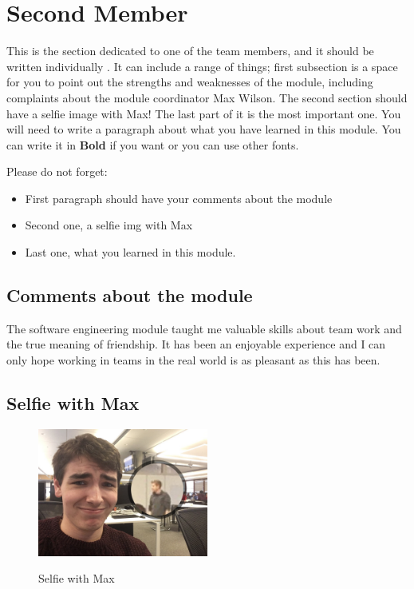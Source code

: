 \section{Second Member}
This is the section dedicated to one of the team members, and it should be written individually . It can include a range of things; first subsection is a space for you to point out the strengths and weaknesses of the module, including complaints about the module coordinator Max Wilson. The second section should have a selfie image with Max! The last part of it is the most important one. You will need to write a paragraph about what you have learned in this module. You can write it in \textbf{Bold} if you want or you can use other fonts. 

Please do not forget:
\begin{itemize}
	\item First paragraph should have your comments about the module
	\item Second one, a selfie img with Max
	\item Last one, what you learned in this module.
\end{itemize}

\subsection{Comments about the module}
The software engineering module taught me valuable skills about team work and the true meaning of friendship. It has been an enjoyable experience and I can only hope working in teams in the real world is as pleasant as this has been. 

\subsection{Selfie with Max}

\begin{figure}[h]
\caption{Selfie with Max}
\centering
\includegraphics[width=0.5\textwidth]{max1.jpg}
\label{fig:selfie}
\end{figure}


